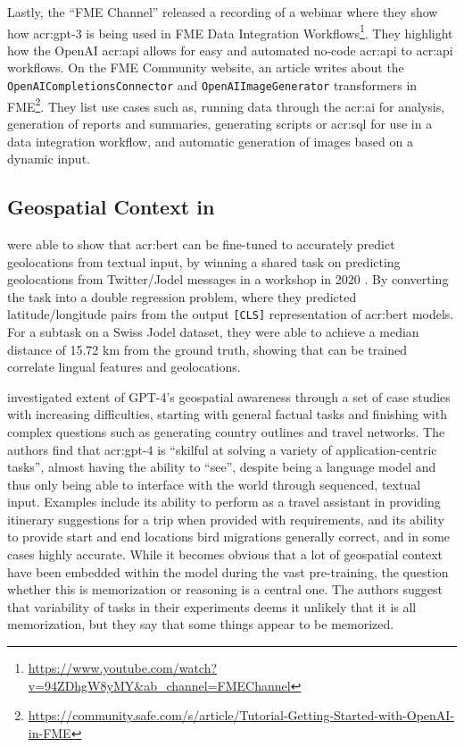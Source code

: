 Lastly, the \enquote{FME Channel} released a recording of a webinar where they show how \acrshort{acr:gpt}-3 is being used in FME Data Integration Workflows\footnote{\url{https://www.youtube.com/watch?v=94ZDhgW8yMY&ab_channel=FMEChannel}}. They highlight how the OpenAI \acrshort{acr:api} allows for easy and automated no-code \acrshort{acr:api} to \acrshort{acr:api} workflows. On the FME Community website, an article writes about the \texttt{OpenAICompletionsConnector} and \texttt{OpenAIImageGenerator} transformers in FME\footnote{\url{https://community.safe.com/s/article/Tutorial-Getting-Started-with-OpenAI-in-FME}}. They list use cases such as, running data through the \acrshort{acr:ai} for analysis, generation of reports and summaries, generating scripts or \acrshort{acr:sql} for use in a data integration workflow, and automatic generation of images based on a dynamic input.

\subsection[Geospatial Context in LLMs]{Geospatial Context in }

\cite{scherrerHeLjuVarDial20202020} were able to show that \acrshort{acr:bert} can be fine-tuned to accurately predict geolocations from textual input, by winning a shared task on predicting geolocations from Twitter/Jodel messages in a workshop in 2020 \citep{gamanReportVarDialEvaluation2020}. By converting the task into a double regression problem, where they predicted latitude/longitude pairs from the output \texttt{[CLS]} representation of \acrshort{acr:bert} models. For a subtask on a Swiss Jodel dataset, they were able to achieve a median distance of 15.72 km from the ground truth, showing that  can be trained correlate lingual features and geolocations.

\cite{robertsGPT4GEOHowLanguage2023} investigated extent of GPT-4's geospatial awareness through a set of case studies with increasing difficulties, starting with general factual tasks and finishing with complex questions such as generating country outlines and travel networks. The authors find that \acrshort{acr:gpt}-4 is \enquote{skilful at solving a variety of application-centric tasks}, almost having the ability to \enquote{see}, despite being a language model and thus only being able to interface with the world through sequenced, textual input. Examples include its ability to perform as a travel assistant in providing itinerary suggestions for a trip when provided with requirements, and its ability to provide start and end locations bird migrations generally correct, and in some cases highly accurate. While it becomes obvious that a lot of geospatial context have been embedded within the model during the vast pre-training, the question whether this is memorization or reasoning is a central one. The authors suggest that variability of tasks in their experiments deems it unlikely that it is all memorization, but they say that some things appear to be memorized.

